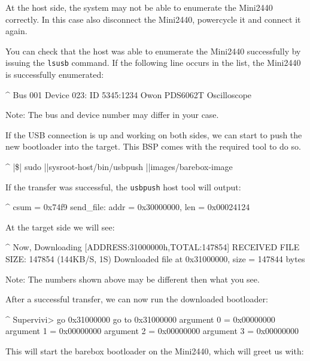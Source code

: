 At the host side, the system may not be able to enumerate the Mini2440
correctly. In this case also disconnect the Mini2440, powercycle it
and connect it again.

You can check that the host was able to enumerate the Mini2440 successfully by
issuing the \texttt{lsusb} command. If the following line occurs in the list,
the Mini2440 is successfully enumerated:

\begin{ptxshell}[escapechar=|]{^}
Bus 001 Device 023: ID 5345:1234 Owon PDS6062T Oscilloscope
\end{ptxshell}

Note: The bus and device number may differ in your case.

If the USB connection is up and working on both sides, we can start to push
the new bootloader into the target. This BSP comes with the required tool to do
so.

\begin{ptxshell}[escapechar=|]{^}
|\$| sudo |\ptxdistPlatformDir |sysroot-host/bin/usbpush |\ptxdistPlatformDir |images/barebox-image
\end{ptxshell}

If the transfer was successful, the \texttt{usbpush} host tool will output:

\begin{ptxshell}[escapechar=|]{^}
csum = 0x74f9
send_file: addr = 0x30000000, len = 0x00024124
\end{ptxshell}

At the target side we will see:

\begin{ptxshell}[escapechar=|]{^}
Now, Downloading [ADDRESS:31000000h,TOTAL:147854]
RECEIVED FILE SIZE:  147854 (144KB/S, 1S)
Downloaded file at 0x31000000, size = 147844 bytes
\end{ptxshell}

Note: The numbers shown above may be different then what you see.

After a successful transfer, we can now run the downloaded bootloader:

\begin{ptxshell}[escapechar=|]{^}
Supervivi>  go 0x31000000
go to 0x31000000
  argument 0 = 0x00000000
  argument 1 = 0x00000000
  argument 2 = 0x00000000
  argument 3 = 0x00000000
\end{ptxshell}

This will start the barebox bootloader on the Mini2440, which will
greet us with:

